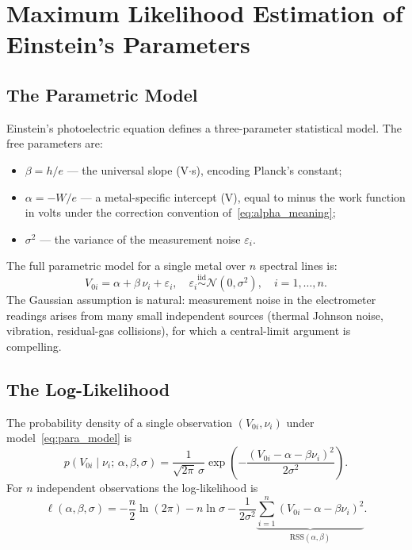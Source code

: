 \documentclass[12pt]{article}
\begin{document}
\section{Maximum Likelihood Estimation of Einstein's Parameters}
\label{sec:mle}

\subsection{The Parametric Model}

Einstein's photoelectric equation defines a three-parameter
statistical model.  The free parameters are:
\begin{itemize}
  \item $\beta = h/e$ --- the universal slope (V$\cdot$s), encoding Planck's constant;
  \item $\alpha = -W/e$ --- a metal-specific intercept (V), equal to minus
    the work function in volts under the correction convention
    of~\eqref{eq:alpha_meaning};
  \item $\sigma^2$ --- the variance of the measurement noise $\varepsilon_i$.
\end{itemize}
The full parametric model for a single metal over $n$ spectral lines is:
\begin{equation}\label{eq:para_model}
  V_{0i} = \alpha + \beta\,\nu_i + \varepsilon_i, \quad
  \varepsilon_i \overset{\text{iid}}{\sim} \mathcal{N}(0,\sigma^2),
  \quad i=1,\ldots,n.
\end{equation}
The Gaussian assumption is natural: measurement noise in the electrometer
readings arises from many small independent sources (thermal Johnson noise,
vibration, residual-gas collisions), for which a central-limit argument is
compelling.

\subsection{The Log-Likelihood}

The probability density of a single observation $(V_{0i},\nu_i)$ under
model~\eqref{eq:para_model} is
\[
  p(V_{0i}\mid\nu_i;\,\alpha,\beta,\sigma) =
  \frac{1}{\sqrt{2\pi}\,\sigma}\exp\!\left(-\frac{(V_{0i}-\alpha-\beta\nu_i)^2}{2\sigma^2}\right).
\]
For $n$ independent observations the log-likelihood is
\begin{equation}\label{eq:loglik}
  \ell(\alpha,\beta,\sigma) =
  -\frac{n}{2}\ln(2\pi) - n\ln\sigma
  - \frac{1}{2\sigma^2}\underbrace{\sum_{i=1}^n(V_{0i}-\alpha-\beta\nu_i)^2}_{\displaystyle\text{RSS}(\alpha,\beta)}.
\end{equation}
\end{document}
